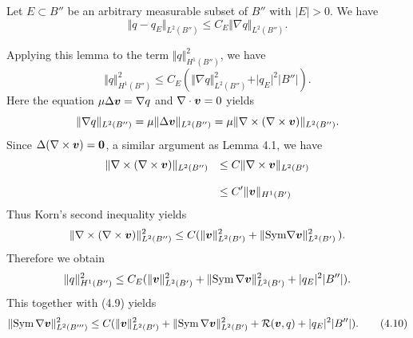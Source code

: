Let $E\subset B''$ be an arbitrary measurable subset of $B''$ with $\vert E\vert>0$.
We have
$$\displaystyle
\Vert q-q_E\Vert_{L^2(B'')}\le C_E\Vert\nabla q\Vert_{L^2(B'')}.
$$

\endproclaim


Applying this lemma to the term $\Vert q\Vert_{H^1(B'')}^2$,
we have
$$\displaystyle
 \Vert q\Vert_{H^1(B'')}^2
 \le C_E(\Vert\nabla q\Vert_{L^2(B'')}^2+\vert q_E\vert^2\vert B''\vert).
 $$
Here the equation $\mu\Delta\mbox{\boldmath $v$}=\nabla q$  and $\nabla\cdot\mbox{\boldmath $v$}=0$
yields
$$\displaystyle
\Vert\nabla q\Vert_{L^2(B'')}=\mu\Vert\Delta\mbox{\boldmath $v$}\Vert_{L^2(B'')}
=\mu\Vert\nabla\times(\nabla\times\mbox{\boldmath $v$})\Vert_{L^2(B'')}.
$$
Since $\Delta(\nabla\times\mbox{\boldmath $v$})=\mbox{\boldmath $0$}$, a similar argument as Lemma 4.1,
we have
$$\begin{array}{ll}
\displaystyle
\Vert\nabla\times(\nabla\times\mbox{\boldmath $v$})\Vert_{L^2(B'')}
&
\displaystyle
\le C\Vert \nabla\times\mbox{\boldmath $v$}\Vert_{L^2(B')}
\\
\\
\displaystyle
&
\displaystyle
\le C'\Vert\mbox{\boldmath $v$}\Vert_{H^1(B')}
\end{array}
$$
Thus Korn's second inequality \cite{DuL} yields
$$\displaystyle
\Vert\nabla\times(\nabla\times\mbox{\boldmath $v$})\Vert_{L^2(B'')}^2
\le C(\Vert\mbox{\boldmath $v$}\Vert_{L^2(B')}^2+\Vert\text{Sym}\nabla\mbox{\boldmath $v$}\Vert_{L^2(B')}^2\,).
$$
Therefore we obtain
$$\displaystyle
\Vert q\Vert_{H^1(B'')}^2
\le
C_E(\Vert\mbox{\boldmath $v$}\Vert_{L^2(B')}^2+\Vert\text{Sym}\,\nabla\mbox{\boldmath $v$}\Vert_{L^2(B')}^2+\vert q_E\vert^2\vert B''\vert).
$$
This together with (4.9) yields
$$
\displaystyle
\Vert\text{Sym}\,\nabla\mbox{\boldmath $v$}\Vert_{L^2(B''')}^2
\le C(\Vert \mbox{\boldmath $v$}\Vert_{L^2(B')}^2+\Vert\text{Sym}\,\nabla\mbox{\boldmath $v$}\Vert_{L^2(B')}^2
+
{\cal R}(\mbox{\boldmath $v$},q)+\vert q_E\vert^2\vert B''\vert).
\tag {4.10}
$$


